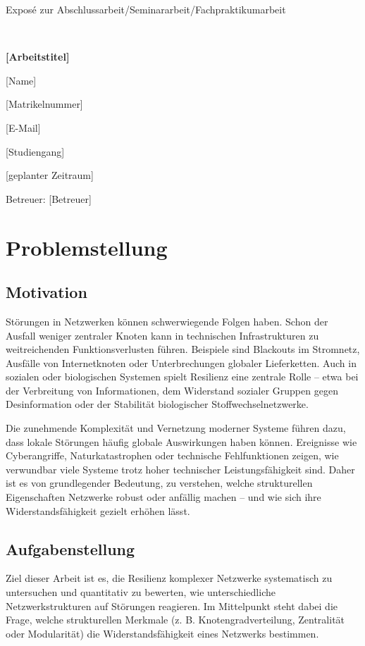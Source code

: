 \documentclass[12pt]{article} %
\begin{document}
\begin{center}
   \baselineskip
   
   Exposé zur Abschlussarbeit/Seminararbeit/Fachpraktikumarbeit
   
   ~
   
   {\LARGE\bfseries
      [Arbeitstitel]}

   \large
   [Name]
   
   [Matrikelnummer]
   
   [E-Mail]
   
   [Studiengang]
   
   [geplanter Zeitraum]
   
   Betreuer: [Betreuer]
\end{center}

\section{Problemstellung}

\subsection{Motivation}
Störungen in Netzwerken können schwerwiegende Folgen haben. Schon der Ausfall weniger zentraler Knoten kann in technischen Infrastrukturen zu weitreichenden Funktionsverlusten führen. Beispiele sind Blackouts im Stromnetz, Ausfälle von Internetknoten oder Unterbrechungen globaler Lieferketten. Auch in sozialen oder biologischen Systemen spielt Resilienz eine zentrale Rolle – etwa bei der Verbreitung von Informationen, dem Widerstand sozialer Gruppen gegen Desinformation oder der Stabilität biologischer Stoffwechselnetzwerke.

Die zunehmende Komplexität und Vernetzung moderner Systeme führen dazu, dass lokale Störungen häufig globale Auswirkungen haben können. Ereignisse wie Cyberangriffe, Naturkatastrophen oder technische Fehlfunktionen zeigen, wie verwundbar viele Systeme trotz hoher technischer Leistungsfähigkeit sind. Daher ist es von grundlegender Bedeutung, zu verstehen, welche strukturellen Eigenschaften Netzwerke robust oder anfällig machen – und wie sich ihre Widerstandsfähigkeit gezielt erhöhen lässt.

\subsection{Aufgabenstellung}
Ziel dieser Arbeit ist es, die Resilienz komplexer Netzwerke systematisch zu untersuchen und quantitativ zu bewerten, wie unterschiedliche Netzwerkstrukturen auf Störungen reagieren. Im Mittelpunkt steht dabei die Frage, welche strukturellen Merkmale (z. B. Knotengradverteilung, Zentralität oder Modularität) die Widerstandsfähigkeit eines Netzwerks bestimmen.
\end{document}
